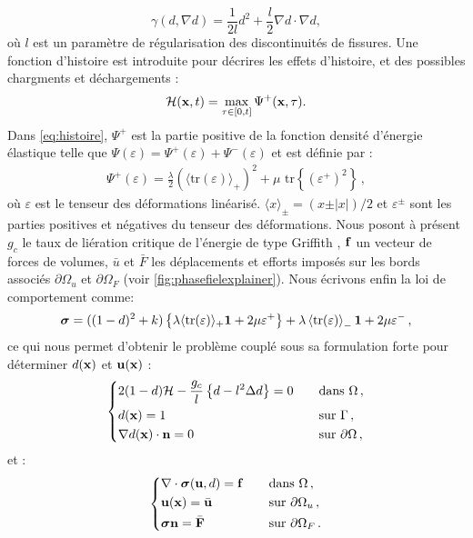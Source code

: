 $$
\gamma (d, \nabla d) = \frac{1}{2l}d^2 + \frac{l}{2}\nabla d \cdot \nabla d,
$$
où $l$ est un paramètre de régularisation des discontinuités de fissures. Une fonction d'histoire est introduite pour décrires les effets d'histoire, et des possibles chargments et déchargements \parencite{miehe2010phase}:
\begin{align}
    \label{eq:histoire}
    \mathcal{H}(\bm{\mathrm{x}}, t) = \max_{\tau \in [0,t]} \Psi^{+}(\bm{\mathrm{x}},\tau) .
\end{align}
Dans \cref{eq:histoire}, $\Psi^+$ est la partie positive de la fonction densité d’énergie élastique telle que $\Psi(\varepsilon) = \Psi^{+}(\varepsilon) + \Psi^{-}(\varepsilon)$
et est définie par :
\begin{align}
    \Psi^{+}(\varepsilon) = \frac{\lambda}{2}(\langle  \text{tr}(\varepsilon) \rangle_{+})^2 + \mu \text{ tr} \left\{ (\varepsilon^{+})^2 \right\} \,,
\end{align}
où $\varepsilon$ est le tenseur des déformations linéarisé. $\langle x\rangle_{\pm} = (x \pm \vert x \vert) / 2$ et $\varepsilon^{\pm}$ sont les parties positives et négatives du tenseur des déformations. Nous posont à présent $g_c$ le taux de liération critique de l'énergie de type Griffith \parencite[p.5]{miehe2010phase}, $\bm{\mathrm{f}}$ un vecteur de forces de volumes, $\bar{u}$ et $\bar{F}$ les déplacements et efforts imposés sur les bords associés $\partial \Omega_u$ et $\partial \Omega_F$ (voir \cref{fig:phasefielexplainer}). Nous écrivons enfin la loi de comportement comme:
\begin{align}
    \bm{\mathrm{\sigma}} = ((1-d)^2 + k)\left\{ \lambda \langle \text{tr}(\varepsilon) \rangle_{+} \bm{\mathrm{1}} + 2\mu \varepsilon^{+}  \right\} + \lambda \left\langle \text{tr}(\varepsilon) \right\rangle_{-} \bm{\mathrm{1}} + 2\mu \varepsilon^{-} \,,
\end{align}
ce qui nous permet d'obtenir le problème couplé sous sa formulation forte pour déterminer $d(\bm{\mathrm{x}})$ et $\bm{\mathrm{u}}(\bm{\mathrm{x}})$ :
\begin{align}
    \begin{dcases}
        2(1-d)\mathcal{H} - \frac{g_c}{l} \left\{ d-l^2 \Delta d \right\} = 0      &\quad \text{dans } \Omega \,, \\
        d(\bm{\mathrm{x}}) = 1   &\quad \text{sur } \Gamma \,, \\
        \nabla d(\bm{\mathrm{x}}) \cdot \bm{\mathrm{n}} = 0   &\quad \text{sur } \partial \Omega \,,
    \end{dcases}
\end{align}
et :
\begin{align}
    \begin{dcases}
        \nabla \cdot \bm{\mathrm{\sigma}}(\bm{\mathrm{u}},d) = \bm{\mathrm{f}} &\quad \text{dans } \Omega \,, \\
        \bm{\mathrm{u}}(\bm{\mathrm{x}}) = \bar{\bm{\mathrm{u}}} &\quad \text{sur } \partial \Omega_u \,, \\
        \bm{\mathrm{\sigma}} \bm{\mathrm{n}} = \bar{\bm{\mathrm{F}}} &\quad \text{sur } \partial \Omega_F \,.
    \end{dcases}
\end{align}

